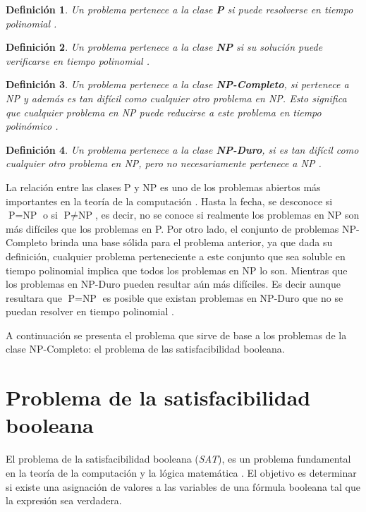 \documentclass[12pt]{article}
\newtheorem{definition}{Definición}
\begin{document}
\begin{definition}
  Un problema pertenece a la clase \textbf{P} si puede resolverse en tiempo polinomial \cite{authomataTheory}.
\end{definition}

\begin{definition}
  Un problema pertenece a la clase \textbf{NP} si su solución puede verificarse en tiempo polinomial \cite{authomataTheory}.
\end{definition}

\begin{definition}
  Un problema pertenece a la clase \textbf{NP-Completo}, si pertenece a NP y además es tan difícil como cualquier otro problema en NP. Esto significa que cualquier problema en NP puede reducirse a este problema en tiempo polinómico \cite{authomataTheory}.
\end{definition}

\begin{definition}
  Un problema pertenece a la clase \textbf{NP-Duro}, si es tan difícil como cualquier otro problema en NP, pero no necesariamente pertenece a NP \cite{authomataTheory}. 
\end{definition}

La relación entre las clases P y NP es uno de los problemas abiertos más importantes en la teoría de la computación \cite{authomataTheory}. Hasta la fecha, se desconoce si $\text{P} = \text{NP}$ o si $\text{P} \neq \text{NP}$, es decir, no se conoce si realmente los problemas en NP son más difíciles que los problemas en P. Por otro lado, el conjunto de problemas NP-Completo brinda una base sólida para el problema anterior, ya que dada su definición, cualquier problema perteneciente a este conjunto que sea soluble en tiempo polinomial implica que todos los problemas en NP lo son. Mientras que los problemas en NP-Duro pueden resultar aún más difíciles. Es decir aunque resultara que $\text{P} = \text{NP}$ es posible que existan problemas en NP-Duro que no se puedan resolver en tiempo polinomial \cite{authomataTheory}.

A continuación se presenta el problema que sirve de base a los problemas de la clase NP-Completo: el problema de las satisfacibilidad
booleana.

\section{Problema de la satisfacibilidad booleana}

El problema de la satisfacibilidad booleana (\textit{SAT}), es un problema fundamental en la teoría de la computación y la lógica matemática \cite{authomataTheory}. El objetivo es determinar si existe una asignación de valores a las variables de una fórmula booleana tal que la expresión sea verdadera.
\end{document}

